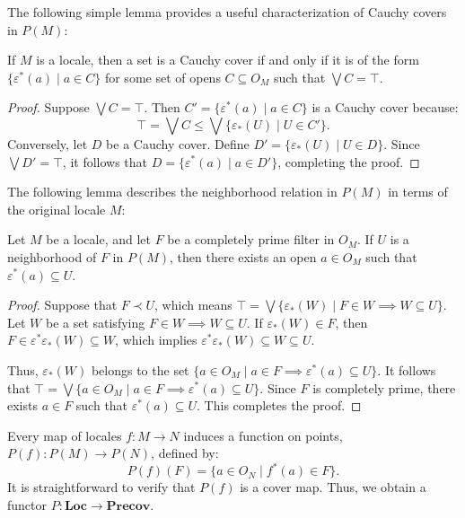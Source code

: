 \documentclass[reqno]{amsart}
\theoremstyle{definition}
\theoremstyle{remark}
\numberwithin{figure}{section}
\newcommand{\rb}{\prec}
\newcommand{\cat}[1]{\mathbf{#1}}
\begin{document}
The following simple lemma provides a useful characterization of Cauchy covers in $P(M)$:

\begin{lem}
If $M$ is a locale, then a set is a Cauchy cover if and only if it is of the form $\{ \varepsilon^*(a) \mid a \in C \}$ for some set of opens $C \subseteq O_M$ such that $\bigvee C = \top$.
\end{lem}
\begin{proof}
Suppose $\bigvee C = \top$.
Then $C' = \{ \varepsilon^*(a) \mid a \in C \}$ is a Cauchy cover because:
\[ \top = \bigvee C \leq \bigvee \{ \varepsilon_*(U) \mid U \in C' \}. \]
Conversely, let $D$ be a Cauchy cover.
Define $D' = \{ \varepsilon_*(U) \mid U \in D \}$.
Since $\bigvee D' = \top$, it follows that $D = \{ \varepsilon^*(a) \mid a \in D' \}$, completing the proof.
\end{proof}

The following lemma describes the neighborhood relation in $P(M)$ in terms of the original locale $M$:

\begin{lem}
Let $M$ be a locale, and let $F$ be a completely prime filter in $O_M$.
If $U$ is a neighborhood of $F$ in $P(M)$, then there exists an open $a \in O_M$ such that $\varepsilon^*(a) \subseteq U$.
\end{lem}
\begin{proof}
Suppose that ${ F } \rb U$, which means $\top = \bigvee \{ \varepsilon_*(W) \mid F \in W \implies W \subseteq U \}$.
Let $W$ be a set satisfying $F \in W \implies W \subseteq U$.
If $\varepsilon_*(W) \in F$, then $F \in \varepsilon^*\varepsilon_*(W) \subseteq W$, which implies $\varepsilon^*\varepsilon_*(W) \subseteq W \subseteq U$.

Thus, $\varepsilon_*(W)$ belongs to the set $\{ a \in O_M \mid a \in F \implies \varepsilon^*(a) \subseteq U \}$.
It follows that $\top = \bigvee \{ a \in O_M \mid a \in F \implies \varepsilon^*(a) \subseteq U \}$.
Since $F$ is completely prime, there exists $a \in F$ such that $\varepsilon^*(a) \subseteq U$.
This completes the proof.
\end{proof}

Every map of locales $f : M \to N$ induces a function on points, $P(f) : P(M) \to P(N)$, defined by:
\[ P(f)(F) = \{ a \in O_N \mid f^*(a) \in F \}. \]
It is straightforward to verify that $P(f)$ is a cover map.  
Thus, we obtain a functor $P : \cat{Loc} \to \cat{Precov}$.
\end{document}
